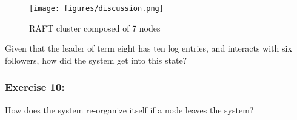 \documentclass[12pt,a4paper]{article}
\begin{document}
\begin{figure}[H]
    \centering
    \texttt{[image: figures/discussion.png]}
    \caption{RAFT cluster composed of 7 nodes}
    \label{fig:inconsistent_logs}
\end{figure}

Given that the leader of term eight has ten log entries, and interacts with six followers, how did the system get into this state?

\subsubsection*{Exercise 10:} How does the system re-organize itself if a node leaves the system?




\end{document}
